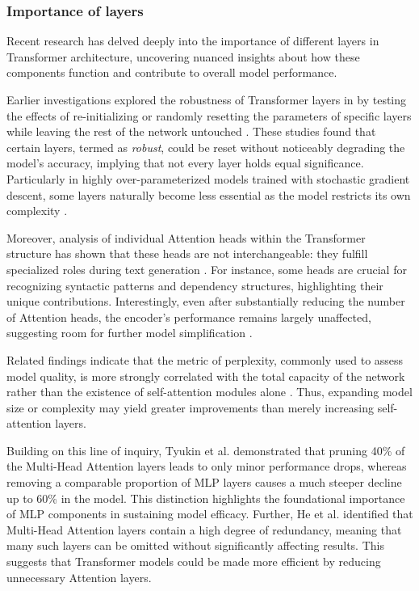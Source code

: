     \subsubsection{Importance of layers}
        Recent research has delved deeply into the importance of different layers in Transformer architecture, uncovering nuanced insights about how these components function and contribute to overall model performance.

        Earlier investigations explored the robustness of Transformer layers in \llms{} by testing the effects of re-initializing or randomly resetting the parameters of specific layers while leaving the rest of the network untouched \cite{zhang2022layerscreatedequal}. These studies found that certain layers, termed as \textit{robust}, could be reset without noticeably degrading the model’s accuracy, implying that not every layer holds equal significance. Particularly in highly over-parameterized models trained with stochastic gradient descent, some layers naturally become less essential as the model restricts its own complexity \cite{zhang2022layerscreatedequal}.

        Moreover, analysis of individual Attention heads within the Transformer structure has shown that these heads are not interchangeable: they fulfill specialized roles during text generation \cite{voita2019analyzingmultiheadselfattentionspecialized}. For instance, some heads are crucial for recognizing syntactic patterns and dependency structures, highlighting their unique contributions. Interestingly, even after substantially reducing the number of Attention heads, the encoder’s performance remains largely unaffected, suggesting room for further model simplification \cite{voita2019analyzingmultiheadselfattentionspecialized}.

        Related findings indicate that the metric of perplexity, commonly used to assess model quality, is more strongly correlated with the total capacity of the network rather than the existence of self-attention modules alone \cite{liu2021payattentionmlps}. Thus, expanding model size or complexity may yield greater improvements than merely increasing self-attention layers.

        Building on this line of inquiry, Tyukin et al. \cite{tyukin2024attentionneeddontneed} demonstrated that pruning 40\% of the Multi-Head Attention layers leads to only minor performance drops, whereas removing a comparable proportion of MLP layers causes a much steeper decline up to 60\% in the \llamaTwoSmall{} model. This distinction highlights the foundational importance of MLP components in sustaining model efficacy. Further, He et al. \cite{he2024matterstransformersattentionneeded} identified that Multi-Head Attention layers contain a high degree of redundancy, meaning that many such layers can be omitted without significantly affecting results. This suggests that Transformer models could be made more efficient by reducing unnecessary Attention layers.
    
